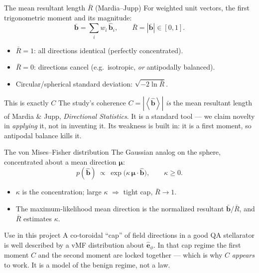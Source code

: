 \documentclass[aspectratio=169]{beamer}
\newcommand{\bb}{\hat{\bm b}}
\newcommand{\avg}[1]{\left\langle #1 \right\rangle}
\newcommand{\ephi}{\hat{\bm e}_\phi}
\begin{document}
\begin{frame}[t]{The mean resultant length $\bar R$ (Mardia--Jupp)}
For weighted unit vectors, the first trigonometric moment and its magnitude:
\[
\bar{\bm b}=\sum_i w_i\,\bb_i,
\qquad
\bar R = |\bar{\bm b}| \in [0,1].
\]
\begin{itemize}
  \item $\bar R = 1$: all directions identical (perfectly concentrated).
  \item $\bar R = 0$: directions cancel (e.g.\ isotropic, \emph{or} antipodally balanced).
  \item Circular/spherical standard deviation: $\sqrt{-2\ln \bar R}$.
\end{itemize}
\begin{block}{This is exactly $C$}
The study's coherence $C=|\avg{\bb}|$ \emph{is} the mean resultant length of Mardia \& Jupp, \emph{Directional Statistics}. It is a standard tool --- we claim novelty in \emph{applying} it, not in inventing it. Its weakness is built in: it is a first moment, so antipodal balance kills it.
\end{block}
\end{frame}

\begin{frame}[t]{The von Mises--Fisher distribution}
The Gaussian analog on the sphere, concentrated about a mean direction $\bm\mu$:
\[
p(\bb)\ \propto\ \exp\!\big(\kappa\,\bm\mu\cdot\bb\big),\qquad \kappa\ge 0 .
\]
\begin{itemize}
  \item $\kappa$ is the concentration; large $\kappa$ $\Rightarrow$ tight cap, $\bar R\to 1$.
  \item The maximum-likelihood mean direction is the normalized resultant $\bar{\bm b}/\bar R$, and $\bar R$ estimates $\kappa$.
\end{itemize}
\begin{block}{Use in this project}
A co-toroidal ``cap'' of field directions in a good QA stellarator is well described by a vMF distribution about $\ephi$. In that cap regime the first moment $C$ and the second moment are locked together --- which is why $C$ \emph{appears} to work. It is a model of the benign regime, not a law.
\end{block}
\end{frame}
\end{document}
